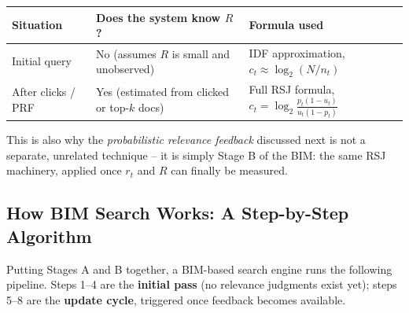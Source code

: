 \documentclass[11pt, a4paper]{article}
\begin{document}
\begin{center}
\begin{tabular}{@{}p{3.2cm}p{3.4cm}p{5.4cm}@{}}
\toprule
Situation & Does the system know $R$? & Formula used \\
\midrule
Initial query & No (assumes $R$ is small and unobserved) & IDF approximation, $c_t \approx \log_2(N/n_t)$ \\
After clicks / PRF & Yes (estimated from clicked or top-$k$ docs) & Full RSJ formula, $c_t = \log_2\frac{p_t(1-u_t)}{u_t(1-p_t)}$ \\
\bottomrule
\end{tabular}
\end{center}

This is also why the \emph{probabilistic relevance feedback} discussed next is not a separate, unrelated technique -- it is simply Stage B of the BIM: the same RSJ machinery, applied once $r_t$ and $R$ can finally be measured.

\subsection{How BIM Search Works: A Step-by-Step Algorithm}

Putting Stages A and B together, a BIM-based search engine runs the following pipeline. Steps 1--4 are the \textbf{initial pass} (no relevance judgments exist yet); steps 5--8 are the \textbf{update cycle}, triggered once feedback becomes available.
\end{document}
